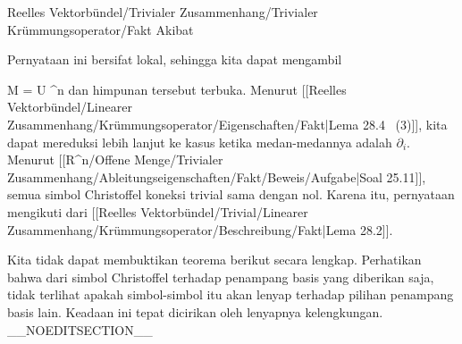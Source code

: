 {Reelles Vektorbündel/Trivialer Zusammenhang/Trivialer Krümmungsoperator/Fakt}
{Akibat}
{}
{

\faktzusatz {}
\faktzusatz {}

}
{

Pernyataan ini bersifat lokal, sehingga kita dapat mengambil

\mavergleichskette
{\vergleichskette
{ M
}
{ = }{ U
}
{ \subseteq }{ \R^n
}
{    }{
}
{   }{
}
}
{}{}{}
dan himpunan tersebut terbuka. Menurut
[[Reelles Vektorbündel/Linearer Zusammenhang/Krümmungsoperator/Eigenschaften/Fakt|Lema 28.4  (3)]],
kita dapat mereduksi lebih lanjut ke kasus ketika medan-medannya adalah
$\partial_i$. Menurut
[[R^n/Offene Menge/Trivialer Zusammenhang/Ableitungseigenschaften/Fakt/Beweis/Aufgabe|Soal 25.11]],
semua simbol Christoffel koneksi trivial sama dengan nol. Karena itu, pernyataan mengikuti dari
[[Reelles Vektorbündel/Trivial/Linearer Zusammenhang/Krümmungsoperator/Beschreibung/Fakt|Lema 28.2]].

}


Kita tidak dapat membuktikan teorema berikut secara lengkap. Perhatikan bahwa dari simbol Christoffel terhadap penampang basis yang diberikan
 {} {}
saja, tidak terlihat apakah simbol-simbol itu akan lenyap terhadap pilihan penampang basis lain. Keadaan ini tepat dicirikan oleh lenyapnya kelengkungan.
__NOEDITSECTION__

